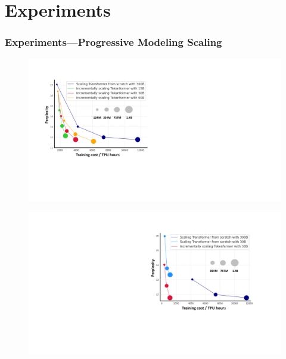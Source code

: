 \section{Experiments}
\begin{frame}
\frametitle{Experiments---Progressive Modeling Scaling}
\begin{figure}[h]
    \centering
    \begin{minipage}{0.49\linewidth}
        \centering
        \includegraphics[width=1.0\linewidth]{./transformer-paper/main_results_v2_left.pdf}
        \label{fig:scaling_accum}
    \end{minipage}
    \hfill
    \begin{minipage}{0.49\linewidth}
        \centering
        \includegraphics[width=1.0\linewidth]{./transformer-paper/main_results_v2_right.pdf}

\end{minipage}
\end{figure}
\end{frame}
